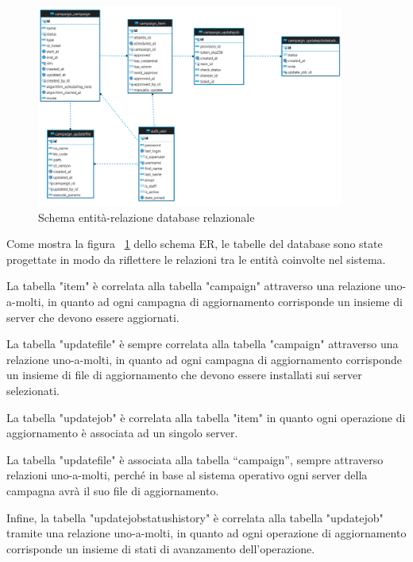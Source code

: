 \begin{figure}[H]
  \begin{flushright}
    \centering
    \includegraphics[width=0.90\textwidth]{imgs/ER_schema.png}
    \caption{Schema entità-relazione database relazionale}
    \label{fig:Schema entità-relazione database relazionale}
  \end{flushright}
\end{figure}

Come mostra la figura ~\ref{fig:Schema entità-relazione database relazionale} 
dello schema ER, le tabelle del database sono state 
progettate in modo da riflettere le relazioni tra le entità coinvolte 
nel sistema.

La tabella "item" è correlata alla tabella "campaign" attraverso una 
relazione uno-a-molti, in quanto ad ogni campagna di aggiornamento 
corrisponde un insieme di server che devono essere aggiornati.

La tabella "updatefile" è sempre correlata alla tabella "campaign" 
attraverso una relazione uno-a-molti, in quanto ad ogni campagna di 
aggiornamento corrisponde un insieme di file di aggiornamento che 
devono essere installati sui server selezionati.

La tabella "updatejob" è correlata alla tabella "item" in quanto ogni 
operazione di aggiornamento è associata ad un singolo server.

La tabella "updatefile" è associata alla tabella “campaign”, sempre 
attraverso relazioni uno-a-molti, perché in base al sistema operativo 
ogni server della campagna avrà il suo file di aggiornamento. 

Infine, la tabella "updatejobstatushistory" è correlata alla tabella 
"updatejob" tramite una relazione uno-a-molti, in quanto ad ogni 
operazione di aggiornamento corrisponde un insieme di stati di 
avanzamento dell'operazione.

